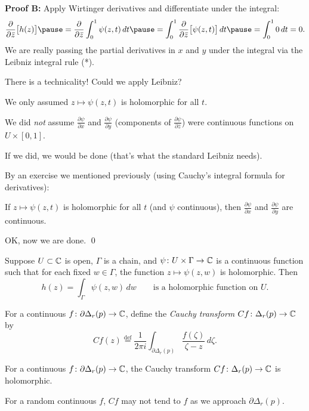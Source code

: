 \documentclass[10pt,aspectratio=169]{beamer}
\begin{document}
\begin{frame}

\textbf{Proof B:}
Apply Wirtinger derivatives and differentiate under the integral:
\pause
\[
\frac{\partial}{\partial \bar{z}}
\bigl[
h(z)
\bigr]
\pause
=
\frac{\partial}{\partial \bar{z}}
\int_0^1 \psi(z,t) \, dt
\pause
=
\int_0^1
\frac{\partial}{\partial \bar{z}}
\bigl[
\psi(z,t)
\bigr]
\, dt
\pause
= \int_0^1 0 \, dt = 0.
\]
\pause
We are really passing the partial derivatives in $x$
and $y$ under the integral via the Leibniz integral rule (*).

\medskip
\pause

There is a technicality!  Could we apply Leibniz?

\medskip
\pause

We only assumed $z \mapsto \psi(z,t)$ is holomorphic for all $t$.

\pause
\medskip

We did \emph{not} assume
$\frac{\partial \psi}{\partial x}$ and $\frac{\partial \psi}{\partial y}$
(components of 
$\frac{\partial \psi}{\partial \bar{z}}$)
were continuous functions on $U \times [0,1]$.

If we did, we would be done (that's what the standard Leibniz needs).

\medskip
\pause

By an exercise we mentioned previously
(using Cauchy's integral formula for derivatives):

If
$z \mapsto \psi(z,t)$ is holomorphic for all $t$ (and $\psi$ continuous),
then
$\frac{\partial \psi}{\partial x}$ and $\frac{\partial \psi}{\partial y}$
are continuous.

\medskip
\pause

OK, now we are done.
\qed

\end{frame}

\begin{frame}
\begin{corollary}
Suppose $U \subset {\mathbb{C}}$ is open, $\Gamma$ is a 
chain,
and
$\psi \colon U \times \Gamma \to {\mathbb{C}}$ is a continuous function such that
for each fixed $w \in \Gamma$, the function $z \mapsto \psi(z,w)$ is
holomorphic.  Then
\[
h(z) =
\int_\Gamma \psi(z,w) \, dw
\qquad \text{is a holomorphic function on } U.
\]
\end{corollary}
\pause

For a continuous $f \colon \partial \Delta_r(p) \to {\mathbb{C}}$, define
the \emph{Cauchy transform} $Cf \colon \Delta_r(p) \to {\mathbb{C}}$ by
\begin{equation*}
Cf(z)
\overset{\text{def}}{=}
\frac{1}{2\pi i}
\int_{\partial \Delta_r(p)}
\frac{f(\zeta)}{\zeta-z}\, d\zeta .
\end{equation*}
\pause

\begin{corollary}
For a continuous $f \colon \partial \Delta_r(p) \to {\mathbb{C}}$,
the Cauchy transform $Cf \colon \Delta_r(p) \to {\mathbb{C}}$ is holomorphic.
\end{corollary}

\pause

For a random continuous $f$, $Cf$ may not tend to $f$ as we approach
$\partial \Delta_r(p)$.
\end{frame}
\end{document}
